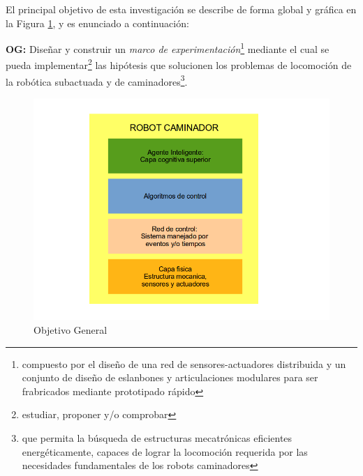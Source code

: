 El principal objetivo de esta investigaci\'on se describe de forma global y gr\'afica en la Figura \ref{fig:objGen}, y es enunciado a continuaci\'on:\par
\textbf{OG:} Dise\~nar y construir un \emph{marco de experimentaci\'on}\footnote{compuesto por el dise\~no de una red de sensores-actuadores distribuida y un conjunto de dise\~no de eslanbones y articulaciones modulares para ser frabricados mediante prototipado r\'apido} mediante el cual se pueda implementar\footnote{estudiar, proponer y/o comprobar} las hip\'otesis que solucionen los problemas de locomoci\'on de la rob\'otica subactuada y de caminadores\footnote{que permita la b\'usqueda de estructuras mecatr\'onicas eficientes energ\'eticamente, capaces de lograr la locomoci\'on requerida por las necesidades fundamentales de los robots caminadores}.\par
\begin{figure}[!htb]
  \centering
  \includegraphics[scale=0.5]{../images/objGen.png}
  \caption{Objetivo General}
  \label{fig:objGen}
\end{figure}

